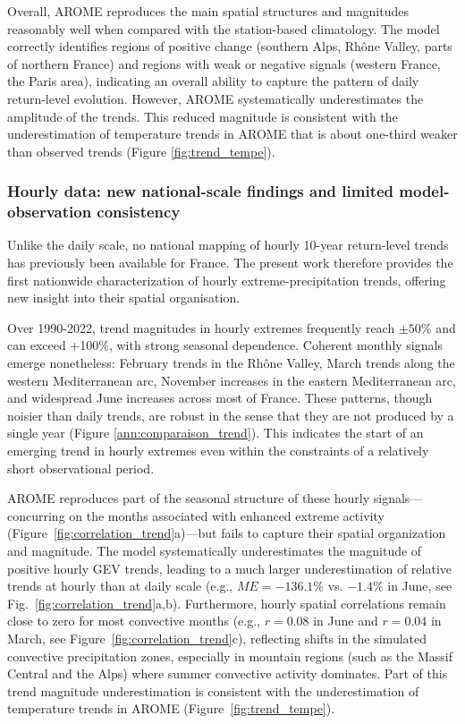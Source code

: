 \documentclass[hess, manuscript]{copernicus}
\begin{document}
Overall, AROME reproduces the main spatial structures and magnitudes reasonably well when compared with the station-based climatology. The model correctly identifies regions of positive change (southern Alps, Rhône Valley, parts of northern France) and regions with weak or negative signals (western France, the Paris area), indicating an overall ability to capture the pattern of daily return-level evolution. However, AROME systematically underestimates the amplitude of the trends. This reduced magnitude is consistent with the underestimation of temperature trends in AROME that is about one-third weaker than observed trends (Figure \ref{fig:trend_tempe}).

\subsubsection{Hourly data: new national-scale findings and limited model-observation consistency}

Unlike the daily scale, no national mapping of hourly 10-year return-level trends has previously been available for France. The present work therefore provides the first nationwide characterization of hourly extreme-precipitation trends, offering new insight into their spatial organisation.

Over 1990-2022, trend magnitudes in hourly extremes frequently reach $\pm 50\%$ and can exceed +100\%, with strong seasonal dependence. Coherent monthly signals emerge nonetheless: February trends in the Rhône Valley, March trends along the western Mediterranean arc, November increases in the eastern Mediterranean arc, and widespread June increases across most of France. These patterns, though noisier than daily trends, are robust in the sense that they are not produced by a single year (Figure \ref{ann:comparaison_trend}). This indicates the start of an emerging trend in hourly extremes even within the constraints of a relatively short observational period.

AROME reproduces part of the seasonal structure of these hourly signals---concurring on the months associated with enhanced extreme activity (Figure~\ref{fig:correlation_trend}a)---but fails to capture their spatial organization and magnitude. The model systematically underestimates the magnitude of positive hourly GEV trends, leading to a much larger underestimation of relative trends at hourly than at daily scale (e.g., $ME = -136.1\%$ vs. $-1.4\%$ in June, see Fig.~\ref{fig:correlation_trend}a,b). Furthermore, hourly spatial correlations remain close to zero for most convective months (e.g., $r = 0.08$ in June and $r = 0.04$ in March, see Figure~\ref{fig:correlation_trend}c), reflecting shifts in the simulated convective precipitation zones, especially in mountain regions (such as the Massif Central and the Alps) where summer convective activity dominates. Part of this trend magnitude underestimation is consistent with the underestimation of temperature trends in AROME (Figure~\ref{fig:trend_tempe}). 
\end{document}
